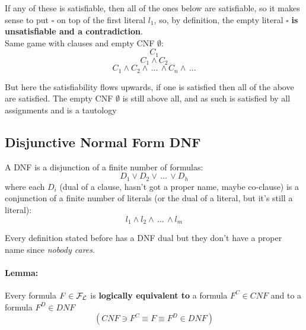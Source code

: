 	If any of these is satisfiable, then all of the ones below are satisfiable, so it makes sense to put $\square$ on top of the first literal $l_1$, so, by definition, the empty literal $\square$ \textbf{is unsatisfiable and a contradiction}.\\

	Same game with clauses and empty CNF $\emptyset$:
	$$ C_1 $$
	$$ C_1 \wedge C_2 $$
	$$ C_1 \wedge C_2 \wedge \, \dots \, \wedge C_n \wedge \, \dots $$

	But here the satisfiability flows upwards, if one is satisfied then all of the above are satisfied. The empty CNF $\emptyset$ is still above all, and as such is satisfied by all assignments and is a tautology

	\subsection{Disjunctive Normal Form DNF}

	A DNF is a disjunction of a finite number of formulas:
	$$ D_1 \vee D_2 \vee \, \dots \, \vee D_h $$
	where each $D_i$ (dual of a clause, hasn't got a proper name, maybe co-clause) is a conjunction of a finite number of literals (or the dual of a literal, but it's still a literal):
	$$ l_1 \wedge l_2 \wedge \, \dots \, \wedge l_m $$

	Every definition stated before has a DNF dual but they don't have a proper name since \textit{nobody cares}.\\

	\paragraph{Lemma:} Every formula $F \in \mathcal{F}_\mathcal{L}$ is \textbf{logically equivalent to} a formula $F^C \in CNF$ and to a formula $F^D \in DNF$
	$$ (CNF \ni F^C \equiv F \equiv F^D \in DNF )$$


